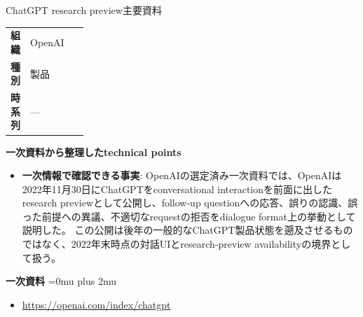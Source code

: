 \begin{technicalnote}{ChatGPT research preview}{主要資料}
\begingroup
\begin{tabularx}{\linewidth}{@{}>{\bfseries}p{0.22\linewidth}X@{}}
組織 & OpenAI \\
種別 & 製品 \\
時系列 & — \\
\end{tabularx}
\smallskip
{\bfseries 一次資料から整理したtechnical points}
\begin{itemize}[leftmargin=1.5em,itemsep=0.35em]
\item \textbf{一次情報で確認できる事実}: OpenAIの選定済み一次資料では、OpenAIは2022年11月30日にChatGPTをconversational interactionを前面に出したresearch previewとして公開し、follow-up questionへの応答、誤りの認識、誤った前提への異議、不適切なrequestの拒否をdialogue format上の挙動として説明した。 この公開は後年の一般的なChatGPT製品状態を遡及させるものではなく、2022年末時点の対話UIとresearch-preview availabilityの境界として扱う。
\end{itemize}
\begin{minipage}{\linewidth}
\begin{samepage}
{\bfseries 一次資料}
\begingroup\sloppy
\Urlmuskip=0mu plus 2mu\relax
\begin{itemize}[leftmargin=1.5em,itemsep=0.25em]
\item {\scriptsize\url{https://openai.com/index/chatgpt}}
\end{itemize}
\endgroup
\end{samepage}
\end{minipage}
\endgroup
\end{technicalnote}
\medskip

